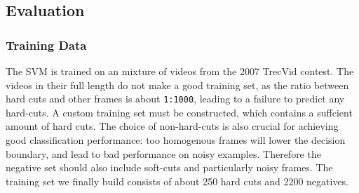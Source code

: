 \subsection{Evaluation}
\label{sec:hard_cut_evaluation}

\subsubsection{Training Data}
The SVM is trained on an mixture of videos from the 2007 TrecVid contest.
The videos in their full length do not make a good training set, as the ratio between hard cuts and other frames is about \texttt{1:1000}, leading to a failure to predict any hard-cuts.
A custom training set must be constructed, which contains a suffcient amount of hard cuts.
The choice of non-hard-cuts is also crucial for achieving good classification performance: too homogenous frames will lower the decision boundary, and lead to bad performance on noisy examples.
Therefore the negative set should also include soft-cuts and particularly noisy frames.
The training set we finally build consists of about 250 hard cuts and 2200 negatives.
